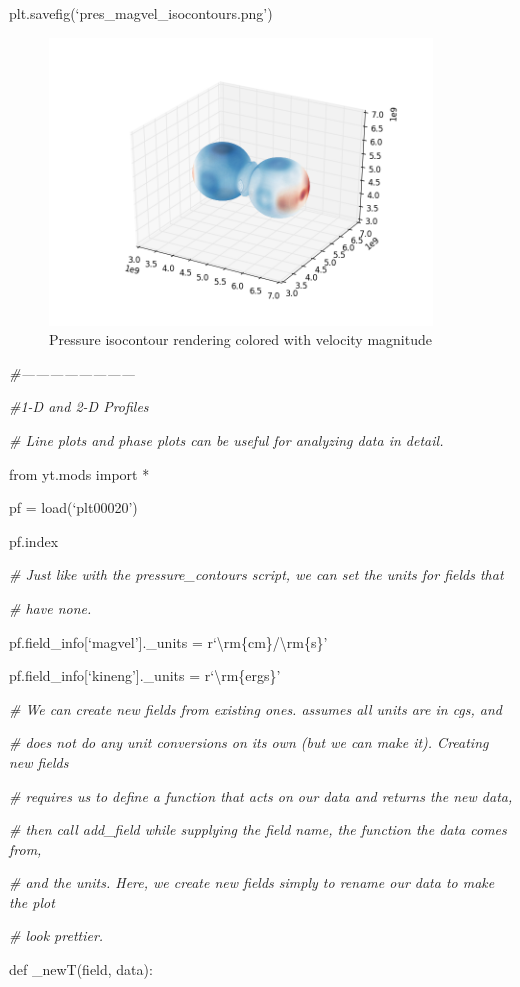 plt.savefig(`pres\_magvel\_isocontours.png')
\begin{figure}[h]
\centering
\includegraphics[width=4in]{isocontours}
\caption{Pressure isocontour rendering colored with velocity magnitude}
\end{figure}

{\it\#------------------------}

{\it\#1-D and 2-D Profiles}
{\setlength{\parskip}{0pt}

{\it\# Line plots and phase plots can be useful for analyzing data in detail.}

from yt.mods import *
}

pf = load(`plt00020')

pf.index

{\it\# Just like with the pressure\_contours script, we can set the units for fields that}
{\setlength{\parskip}{0pt}

{\it\# have none.}

pf.field\_info[`magvel'].\_units = r`\textbackslash rm\{cm\}/\textbackslash rm\{s\}'
}

pf.field\_info[`kineng'].\_units = r`\textbackslash rm\{ergs\}'

{\it\# We can create new fields from existing ones. \yt assumes all units are in cgs, and}
{\setlength{\parskip}{0pt}

{\it\# does not do any unit conversions on its own (but we can make it). Creating new fields}

{\it\#  requires us to define a function that acts on our data and returns the new data,}

{\it\# then call add\_field while supplying the field name, the function the data comes from,}

{\it\# and the units. Here, we create new fields simply to rename our data to make the plot}

{\it\# look prettier.}

def \_newT(field, data):
}

